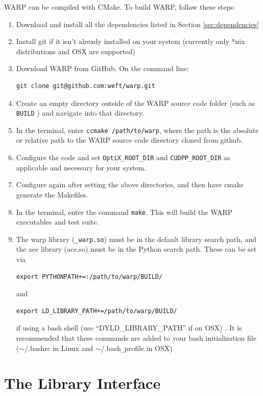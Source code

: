 \documentclass[twoside,a4paper]{refart}
\begin{document}
WARP can be compiled with CMake. To build WARP, follow these steps:

\begin{enumerate}
\item{Download and install all the dependencies listed in Section \ref{sec:dependencies}}
\item{Install git if it isn't already installed on your system (currently only *nix distributions and OSX are supported)}
\item{Download WARP from GitHub.  On the command line: 
\begin{verbatim}
git clone git@github.com:weft/warp.git
\end{verbatim}}
\item{Create an empty directory outside of the WARP source code folder (such as \texttt{BUILD} ) and navigate into that directory.}
\item{In the terminal, enter \texttt{ccmake /path/to/warp}, where the path is the absolute or relative 
path to the WARP source code directory cloned from github.}
\item{Configure the code and set \texttt{OptiX\_ROOT\_DIR} and \texttt{CUDPP\_ROOT\_DIR} as applicable
and necessary for your system.}
\item{Configure again after setting the above directories, and then have cmake generate the Makefiles.}
\item{In the terminal, enter the command \texttt{make}. This will build the WARP executables and test 
suite.}
\item{The warp library (\texttt{\_warp.so}) must be in the default library search path, and the ace library (ace.so) must be in the Python search path.  These can be set via
\begin{verbatim}
export PYTHONPATH+=:/path/to/warp/BUILD/
\end{verbatim} and 
\begin{verbatim}
export LD_LIBRARY_PATH+=/path/to/warp/BUILD/
\end{verbatim} 
if using a bash shell (use ``DYLD\_LIBRARY\_PATH'' if on OSX) .  It is recommended that these commands are added to your bash initialization file ($\sim$/.bashrc in Linux and $\sim$/.bash\texttt{\_}profile in OSX)}
\end{enumerate}

\section{The Library Interface}
\end{document}

